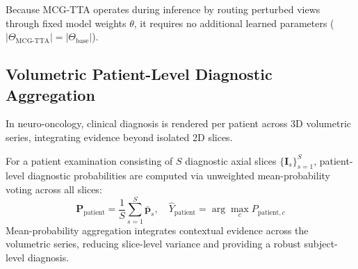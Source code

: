 Because MCG-TTA operates during inference by routing perturbed views through fixed model weights $\theta$, it requires no additional learned parameters ($|\Theta_{\text{MCG-TTA}}| = |\Theta_{\text{base}}|$).

\subsection{Volumetric Patient-Level Diagnostic Aggregation}

In neuro-oncology, clinical diagnosis is rendered per patient across 3D volumetric series, integrating evidence beyond isolated 2D slices.

For a patient examination consisting of $S$ diagnostic axial slices $\{\mathbf{I}_s\}_{s=1}^S$, patient-level diagnostic probabilities are computed via unweighted mean-probability voting across all slices:
\begin{equation}
\mathbf{P}_{\text{patient}} = \frac{1}{S} \sum_{s=1}^S \bar{\mathbf{p}}_s, \quad \hat{Y}_{\text{patient}} = \arg\max_{c} P_{\text{patient}, c}
\label{eq:patient_aggregation}
\end{equation}
Mean-probability aggregation integrates contextual evidence across the volumetric series, reducing slice-level variance and providing a robust subject-level diagnosis.


